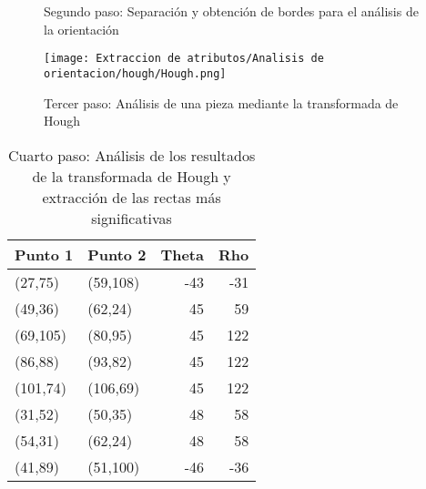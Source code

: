 \begin{figure}[ht]  %
  \hfill	
  \hfill	
\caption[Separación y obtención de bordes para el análisis de la orientación]{Segundo paso: Separación y obtención de bordes para el análisis de la orientación}
\label{fig:orientación bordes}
\vspace{-5pt}
\end{figure}

\begin{figure}[ht] %
	\centering
	\texttt{[image: Extraccion de atributos/Analisis de orientacion/hough/Hough.png]}
	\caption[Análisis de una pieza mediante la transformada de Hough]{Tercer paso: Análisis de una pieza mediante la transformada de Hough}
	\label{fig:orientacion hough}
	\vspace{-5pt}
\end{figure}

\begin{table}[ht] %
  \centering
    \begin{tabular}{|l|l|r|r|}
    \hline
    \multicolumn{1}{|c|}{Punto 1} & \multicolumn{1}{c|}{Punto 2} & \multicolumn{1}{c|}{Theta} & \multicolumn{1}{c|}{Rho}\\
    \hline
    (27,75) & (59,108) & -43   & -31\\
    (49,36) & (62,24) & 45    & 59 \\
    (69,105) & (80,95) & 45    & 122 \\
    (86,88) & (93,82) & 45    & 122 \\
    (101,74) & (106,69) & 45    & 122 \\
    (31,52) & (50,35) & 48    & 58 \\
    (54,31) & (62,24) & 48    & 58 \\
    (41,89) & (51,100) & -46   & -36\\
    \hline
    \end{tabular}%
  \caption[Resultados de la transformada de Hough]{Cuarto paso: Análisis de los resultados de la transformada de Hough y extracción de las rectas más significativas}
  \label{tab:orientacion hough}%
\end{table}%

